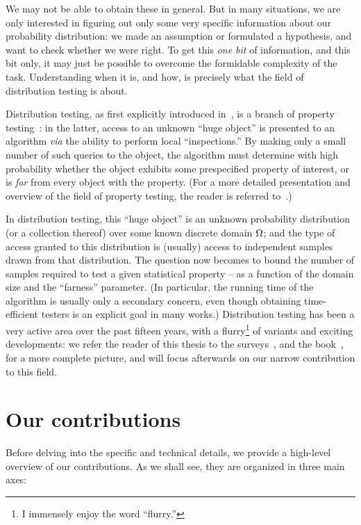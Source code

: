 We may not be able to obtain these in general. But in many situations, we are only interested in figuring out only some very specific information about our probability distribution: we made an assumption or formulated a hypothesis, and want to check whether we were right. To get this \emph{one bit} of information, and this bit only, it may just be possible to overcome the formidable complexity of the task. Understanding when it is, and how, is precisely what the field of distribution testing is about.

Distribution testing, as first explicitly introduced in~\cite{BFRSW:00}, is a branch of property testing~\cite{RS:96,GGR:98}: in the latter, access to an unknown ``huge object'' is presented to an algorithm \textit{via} the ability to perform local ``inspections.'' By making only a small number of such queries to the object, the algorithm must determine with high probability whether the object exhibits some prespecified property of interest, or is \emph{far} from every object with the property. (For a more detailed presentation and overview of the field of property testing, the reader is referred to~\cite{Fischer:01,Ron:08,Ron:10,Goldreich:10,Gol:17,BY:17}.)

In distribution testing, this ``huge object'' is an unknown probability distribution (or a collection thereof) over some known discrete domain ${\Omega}$; and the type of access granted to this distribution is (usually) access to independent samples drawn from that distribution. The question now becomes to bound the number of samples required to test a given statistical property -- as a function of the domain size and the ``farness'' parameter. (In particular, the running time of the algorithm is usually only a secondary concern, even though obtaining time-efficient testers is an explicit goal in many works.) Distribution testing has been a very active area over the past fifteen years, with a flurry\footnote{I immensely enjoy the word ``flurry.''}{} of variants and exciting developments: we refer the reader of this thesis to the surveys~\cite{Rubinfeld:12:Survey,Canonne:15:Survey}, and the book~\cite{Gol:17}, for a more complete picture, and will focus afterwards on our narrow contribution to this field.

\section*{Our contributions}
Before delving into the specific and technical details, we provide a high-level overview of our contributions. As we shall see, they are organized in three main axes:

